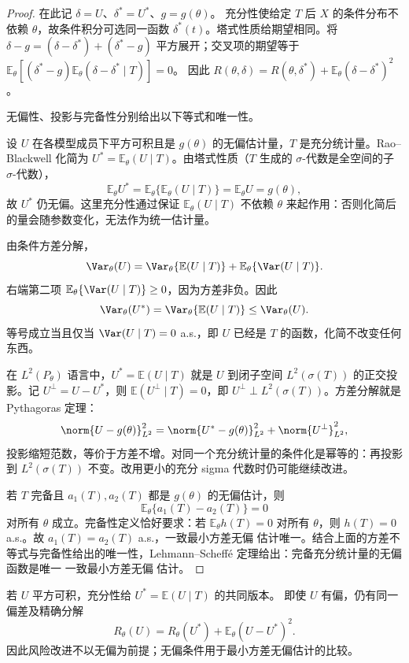 \begin{proof}
在此记 \(\delta=U\)、\(\delta^*=U^*\)、\(g=g(\theta)\)。
充分性使给定 \(T\) 后 \(X\) 的条件分布不依赖 \(\theta\)，故条件积分可选同一函数 \(\delta^*(t)\)。塔式性质给期望相同。将
\(\delta-g=(\delta-\delta^*)+(\delta^*-g)\) 平方展开；交叉项的期望等于
\(\mathbb E_\theta[(\delta^*-g)\mathbb E_\theta(\delta-\delta^*\mid T)]=0\)。
因此
\(R(\theta,\delta)=R(\theta,\delta^*)+
\mathbb E_\theta(\delta-\delta^*)^2\)。

无偏性、投影与完备性分别给出以下等式和唯一性。

设 $U$ 在各模型成员下平方可积且是 $g(\theta)$ 的无偏估计量，$T$ 是充分统计量。Rao--Blackwell 化简为 $U^*=\mathbb E_\theta(U\mid T)$。由塔式性质（$T$ 生成的 $\sigma$-代数是全空间的子 $\sigma$-代数），
\[
 \mathbb E_\theta U^*
 =\mathbb E_\theta\{\mathbb E_\theta(U\mid T)\}
 =\mathbb E_\theta U
 =g(\theta),
\]
故 $U^*$ 仍无偏。这里充分性通过保证 $\mathbb E_\theta(U\mid T)$ 不依赖 $\theta$ 来起作用：否则化简后的量会随参数变化，无法作为统一估计量。

由条件方差分解，
\[
 \Var_\theta(U)
 =\Var_\theta\{\mathbb E(U\mid T)\}
 +\mathbb E_\theta\{\Var(U\mid T)\}.
\]
右端第二项 $\mathbb E_\theta\{\Var(U\mid T)\}\ge0$，因为方差非负。因此
\[
 \Var_\theta(U^*)
 =\Var_\theta\{\mathbb E(U\mid T)\}
 \le\Var_\theta(U).
\]
等号成立当且仅当 $\Var(U\mid T)=0$ a.s.，即 $U$ 已经是 $T$ 的函数，化简不改变任何东西。

在 $L^2(P_\theta)$ 语言中，$U^*=\mathbb E(U\mid T)$ 就是 $U$ 到闭子空间 $L^2(\sigma(T))$ 的正交投影。记 $U^\perp=U-U^*$，则 $\mathbb E(U^\perp\mid T)=0$，即 $U^\perp\perp L^2(\sigma(T))$。方差分解就是 Pythagoras 定理：
\[
 \norm{U-g(\theta)}_{L^2}^2
 =\norm{U^*-g(\theta)}_{L^2}^2
 +\norm{U^\perp}_{L^2}^2,
\]
投影缩短范数，等价于方差不增。对同一个充分统计量的条件化是幂等的：再投影到 $L^2(\sigma(T))$ 不变。改用更小的充分 sigma 代数时仍可能继续改进。

若 $T$ 完备且 $a_1(T),a_2(T)$ 都是 $g(\theta)$ 的无偏估计，则
\[
 \mathbb E_\theta\{a_1(T)-a_2(T)\}=0
\]
对所有 $\theta$ 成立。完备性定义恰好要求：若 $\mathbb E_\theta h(T)=0$ 对所有 $\theta$，则 $h(T)=0$ a.s.。故 $a_1(T)=a_2(T)$ a.s.，一致最小方差无偏 估计唯一。结合上面的方差不等式与完备性给出的唯一性，Lehmann--Scheff\'e 定理给出：完备充分统计量的无偏函数是唯一 一致最小方差无偏 估计。
\end{proof}


\begin{corollary}[条件化也改进有偏估计的平方风险]
若 $U$ 平方可积，充分性给 $U^*=\mathbb E(U\mid T)$ 的共同版本。
即使 $U$ 有偏，仍有同一偏差及精确分解
\[
 R_\theta(U)=R_\theta(U^*)+\mathbb E_\theta(U-U^*)^2.
\]
因此风险改进不以无偏为前提；无偏条件用于最小方差无偏估计的比较。
\end{corollary}

